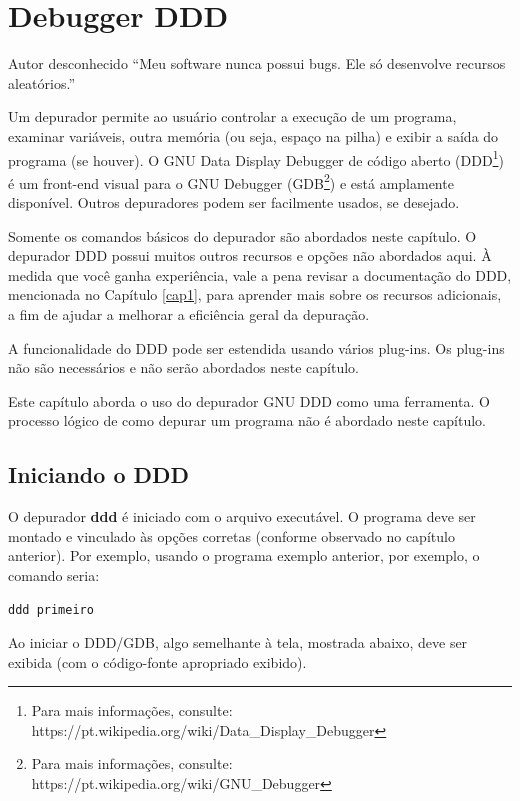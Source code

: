 \chapter{Debugger DDD}

\begin{chapquote}{Autor desconhecido}
``Meu software nunca possui bugs. Ele só
desenvolve recursos aleatórios.''
\end{chapquote}

Um depurador permite ao usuário controlar a execução de um programa, examinar variáveis, outra memória (ou seja, espaço na pilha) e exibir a saída do programa (se houver). O GNU Data Display Debugger de código aberto (DDD\footnote{Para mais informações, consulte: https://pt.wikipedia.org/wiki/Data\_Display\_Debugger}) é um front-end visual para o GNU Debugger (GDB\footnote{Para mais informações, consulte: https://pt.wikipedia.org/wiki/GNU\_Debugger}) e está amplamente disponível. Outros depuradores podem ser facilmente usados, se desejado.

Somente os comandos básicos do depurador são abordados neste capítulo. O depurador DDD possui muitos outros recursos e opções não abordados aqui. À medida que você ganha experiência, vale a pena revisar a documentação do DDD, mencionada no Capítulo \ref{cap1}, para aprender mais sobre os recursos adicionais, a fim de ajudar a melhorar a eficiência geral da depuração.

A funcionalidade do DDD pode ser estendida usando vários plug-ins. Os plug-ins não são necessários e não serão abordados neste capítulo.

Este capítulo aborda o uso do depurador GNU DDD como uma ferramenta. O processo lógico de como depurar um programa não é abordado neste capítulo.

\section{Iniciando o DDD}
O depurador \textbf{ddd} é iniciado com o arquivo executável. O programa deve ser montado e vinculado às opções corretas (conforme observado no capítulo anterior). Por exemplo, usando o programa exemplo anterior, por exemplo, o comando seria:
\begin{verbatim}
ddd primeiro
\end{verbatim}

Ao iniciar o DDD/GDB, algo semelhante à tela, mostrada abaixo, deve ser exibida (com o código-fonte apropriado exibido).

